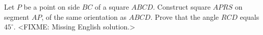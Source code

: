\problem
Let $P$ be a point on side $BC$ of a square $ABCD$.
Construct square $APRS$ on segment $AP$, of the same orientation as $ABCD$.
Prove that the angle $RCD$ equals $45^\circ$.
\solution
<FIXME: Missing English solution.>
\endproblem
